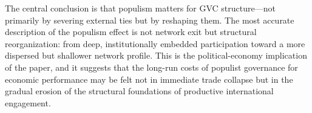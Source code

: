 \documentclass[12pt]{article}
\begin{document}
The central conclusion is that populism matters for GVC structure---not primarily by severing external ties but by reshaping them. The most accurate description of the populism effect is not network exit but structural reorganization: from deep, institutionally embedded participation toward a more dispersed but shallower network profile. This is the political-economy implication of the paper, and it suggests that the long-run costs of populist governance for economic performance may be felt not in immediate trade collapse but in the gradual erosion of the structural foundations of productive international engagement.


\clearpage



\clearpage




\clearpage



\clearpage



\clearpage



\clearpage



\clearpage


\end{document}

